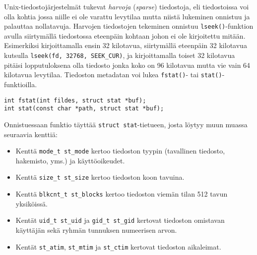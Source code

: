 Unix-tiedostojärjestelmät tukevat \emph{harvoja} (\emph{sparse}) tiedostoja,
eli tiedostoissa voi olla kohtia jossa niille ei ole varattu levytilaa mutta niistä lukeminen onnistuu ja palauttaa nollatavuja.
Harvojen tiedostojen tekeminen onnistuu \texttt{lseek()}-funktion avulla siirtymällä tiedostossa eteenpäin kohtaan johon ei ole kirjoitettu mitään.
Esimerkiksi kirjoittamalla ensin 32 kilotavua,
siirtymällä eteenpäin 32 kilotavua kutsulla \texttt{lseek(fd, 32768, SEEK\_CUR)},
ja kirjoittamalla toiset 32 kilotavua pitäisi lopputuloksena olla tiedosto jonka koko on 96 kilotavua mutta vie vain 64 kilotavua levytilaa.
Tiedoston metadatan voi lukea \texttt{fstat()}- tai \texttt{stat()}-funktioilla.

\begin{verbatim}
int fstat(int fildes, struct stat *buf);
int stat(const char *path, struct stat *buf);
\end{verbatim}
%
Onnistuessaan funktio täyttää \texttt{struct stat}-tietueen,
josta löytyy muun muassa seuraavia kenttiä:
%
\begin{itemize}
    \item Kenttä \texttt{mode\_t st\_mode} kertoo tiedoston tyypin (tavallinen tiedosto, hakemisto, yms.) ja käyttöoikeudet.
    \item Kenttä \texttt{size\_t st\_size} kertoo tiedoston koon tavuina.
    \item Kenttä \texttt{blkcnt\_t st\_blocks} kertoo tiedoston viemän tilan 512 tavun yksiköissä.
    \item Kentät \texttt{uid\_t st\_uid} ja \texttt{gid\_t st\_gid} kertovat tiedoston omistavan käyttäjän sekä ryhmän tunnuksen numeerisen arvon.
    \item Kentät \texttt{st\_atim}, \texttt{st\_mtim} ja \texttt{st\_ctim} kertovat tiedoston aikaleimat.
\end{itemize}

%
%

